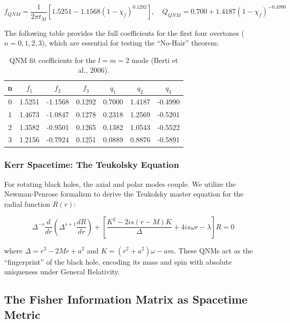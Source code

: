 \documentclass[11pt,a4paper,spanish]{book}
\numberwithin{equation}{chapter}
\numberwithin{figure}{chapter}
\numberwithin{equation}{chapter}
\numberwithin{figure}{chapter}
\numberwithin{table}{chapter}
\begin{document}
\begin{equation}
f_{QNM} = \frac{1}{2\pi t_M} \left[ 1.5251 - 1.1568(1-\chi_f)^{0.1292} \right], \quad Q_{QNM} = 0.700 + 1.4187(1-\chi_f)^{-0.4990}
\end{equation}

The following table provides the full coefficients for the first four overtones ($n=0,1,2,3$), which are essential for testing the ``No-Hair'' theorem:

\begin{table}[h]
\centering
\caption{QNM fit coefficients for the $l=m=2$ mode (Berti et al., 2006).}
\begin{tabular}{@{}ccccccc@{}}
\toprule
\textbf{n} & \textbf{$f_1$} & \textbf{$f_2$} & \textbf{$f_3$} & \textbf{$q_1$} & \textbf{$q_2$} & \textbf{$q_3$} \\ \midrule
0 & 1.5251 & -1.1568 & 0.1292 & 0.7000 & 1.4187 & -0.4990 \\
1 & 1.4673 & -1.0847 & 0.1278 & 0.2318 & 1.2569 & -0.5201 \\
2 & 1.3582 & -0.9501 & 0.1265 & 0.1382 & 1.0543 & -0.5522 \\
3 & 1.2156 & -0.7924 & 0.1251 & 0.0889 & 0.8876 & -0.5891 \\ \bottomrule
\end{tabular}
\end{table}

\subsubsection{Kerr Spacetime: The Teukolsky Equation}

For rotating black holes, the axial and polar modes couple. We utilize the Newman-Penrose formalism to derive the Teukolsky master equation for the radial function $R(r)$:

\begin{equation}
\Delta^{-s} \frac{d}{dr} \left( \Delta^{s+1} \frac{dR}{dr} \right) + \left[ \frac{K^2 - 2is(r-M)K}{\Delta} + 4is\omega r - \lambda \right] R = 0
\end{equation}

where $\Delta = r^2 - 2Mr + a^2$ and $K = (r^2+a^2)\omega - am$. These QNMs act as the ``fingerprint'' of the black hole, encoding its mass and spin with absolute uniqueness under General Relativity.

\subsection{The Fisher Information Matrix as Spacetime Metric}
\end{document}
